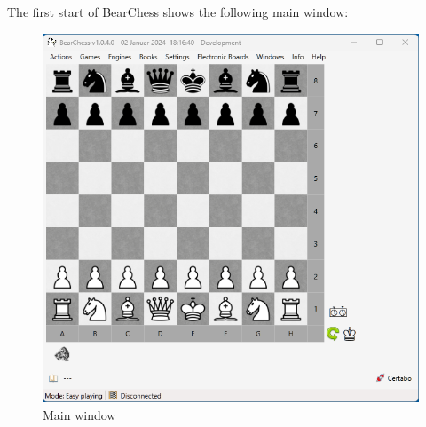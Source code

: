 \documentclass[11pt,a4paper]{article}
\begin{document}
The first start of BearChess shows the following main window:
\begin{figure}[H]
	\centering
	\includegraphics[scale=0.7]{BearChess_MainWindow.png}
	\caption{Main window}
	\label{fig:MainWindow}
\end{figure}
\end{document}
